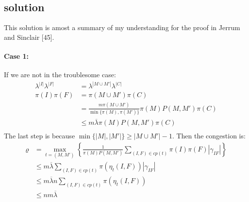 \documentclass{article}
\begin{document}
\subsection{solution}
This solution is amost a summary of my understanding for the proof in Jerrum and Sinclair [45].
\paragraph{Case 1:} If we are not in the troublesome case:
\begin{align*}
  \lambda^{|I|}\lambda^{|F|} &= \lambda^{|M\cup M'|}\lambda^{|C|} \\
  \pi(I)\pi(F) &= \pi(M\cup M')\pi(C) \\
  &= \frac{m\pi(M\cup M')}{\min\{\pi(M), \pi(M')\}}\pi(M)P(M, M')\pi(C) \\
  &\leq m\overline{\lambda}\pi(M)P(M, M')\pi(C) \\
\end{align*}
The last step is because $\min\{|M|, |M'|\} \geq |M\cup M'| - 1$.
Then the congestion is:
\begin{align*}
  \varrho &= \max_{t = (M, M')} \left\{\frac{1}{\pi(M)P(M, M')}\sum_{(I,F)\in cp(t)} \pi(I)\pi(F)|\gamma_{IF}|\right\} \\
  &\leq m\overline{\lambda}\sum_{(I,F)\in cp(t)} \pi(\eta_t(I, F))|\gamma_{IF}| \\
  &\leq m\overline{\lambda}n\sum_{(I,F)\in cp(t)} \pi(\eta_t(I, F)) \\
  &\leq nm\overline{\lambda}
\end{align*}
\end{document}
